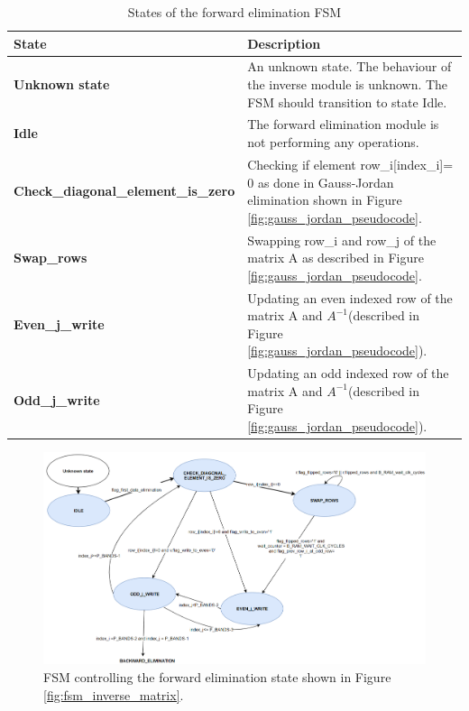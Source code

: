 \begin{table}[H]
\centering
 \resizebox{1\textwidth}{!}
{\begin{tabular}{l|l}
State                                                                                    & Description                                                                                   \\
\hline
\textbf{Unknown state}                                                                   & An unknown state. The behaviour of the inverse module is unknown. The FSM should transition to state Idle.                                    \\
\textbf{Idle}                                                                            & The forward elimination module is not performing any operations.                                          \\
\textbf{Check\_diagonal\_element\_is\_zero} & Checking if element row\_i[index\_i]= 0 as done in Gauss-Jordan elimination shown in Figure \ref{fig:gauss_jordan_pseudocode}.     \\
\textbf{Swap\_rows}                                                            & Swapping row\_i and row\_j of the matrix A as described in Figure \ref{fig:gauss_jordan_pseudocode}.        \\
\textbf{Even\_j\_write}                                                           & Updating an even indexed row of the matrix A and $A^{-1}$(described in Figure \ref{fig:gauss_jordan_pseudocode}).       \\
\textbf{Odd\_j\_write}                                                                  & Updating an odd indexed row of the matrix A and $A^{-1}$(described in Figure \ref{fig:gauss_jordan_pseudocode}).   
\end{tabular}}
\caption{States of the forward elimination FSM}
\label{tab:fsm_forward_elimination}

\end{table}


\begin{figure}[H]
\centering
   \includegraphics[scale=0.4]{images/inverse_hw/fsm_forward_elimination.png}
  \caption{FSM controlling the forward elimination state shown in Figure \ref{fig:fsm_inverse_matrix}.  } 
  \label{fig:fsm_forward_elimination}
\end{figure}


